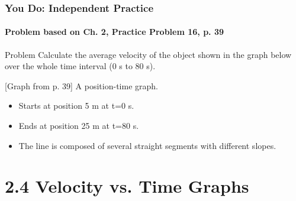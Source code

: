 \documentclass{beamer}
\begin{document}
\begin{frame}
\frametitle{You Do: Independent Practice}
\framesubtitle{Problem based on Ch. 2, Practice Problem 16, p. 39}
\begin{block}{Problem}
Calculate the average velocity of the object shown in the graph below over the whole time interval (0 s to 80 s).
\end{block}
\begin{alertblock}{[Graph from p. 39]}
A position-time graph.
\begin{itemize}
    \item Starts at position 5 m at t=0 s.
    \item Ends at position 25 m at t=80 s.
    \item The line is composed of several straight segments with different slopes.
\end{itemize}
\end{alertblock}
\end{frame}

\section{2.4 Velocity vs. Time Graphs}
\end{document}

